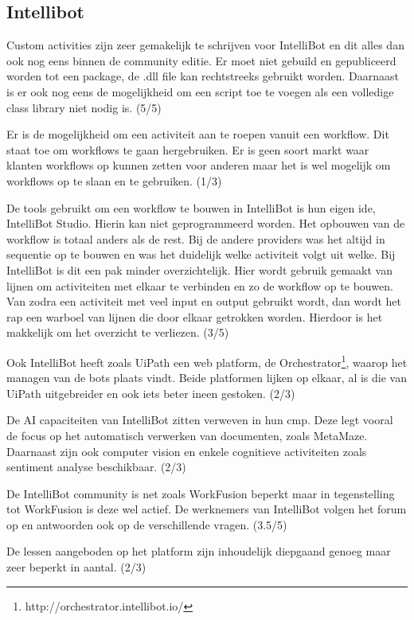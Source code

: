 \subsection{Intellibot}

Custom activities zijn zeer gemakelijk te schrijven voor IntelliBot en dit alles dan ook nog eens binnen de community editie. Er moet niet gebuild en gepubliceerd worden tot een package, de .dll file kan rechtstreeks gebruikt worden. Daarnaast is er ook nog eens de mogelijkheid om een script toe te voegen als een volledige class library niet nodig is. (5/5)

Er is de mogelijkheid om een activiteit aan te roepen vanuit een workflow. Dit staat toe om workflows te gaan hergebruiken. Er is geen soort markt waar klanten workflows op kunnen zetten voor anderen maar het is wel mogelijk om workflows op te slaan en te gebruiken. (1/3)

De tools gebruikt om een workflow te bouwen in IntelliBot is hun eigen ide, IntelliBot Studio. Hierin kan niet geprogrammeerd worden. Het opbouwen van de workflow is totaal anders als de rest. Bij de andere providers was het altijd in sequentie op te bouwen en was het duidelijk welke activiteit volgt uit welke. Bij IntelliBot is dit een pak minder overzichtelijk. Hier wordt gebruik gemaakt van lijnen om activiteiten met elkaar te verbinden en zo de workflow op te bouwen. Van zodra een activiteit met veel input en output gebruikt wordt, dan wordt het rap een warboel van lijnen die door elkaar getrokken worden. Hierdoor is het makkelijk om het overzicht te verliezen. (3/5)

Ook IntelliBot heeft zoals UiPath een web platform, de Orchestrator\footnote{http://orchestrator.intellibot.io/}, waarop het managen van de bots plaats vindt. Beide platformen lijken op elkaar, al is die van UiPath uitgebreider en ook iets beter ineen gestoken. (2/3)

De AI capaciteiten van IntelliBot zitten verweven in hun \acrfull{cmp}. Deze legt vooral de focus op het automatisch verwerken van documenten, zoals MetaMaze. Daarnaast zijn ook computer vision en enkele cognitieve activiteiten zoals sentiment analyse beschikbaar. (2/3)

De IntelliBot community is net zoals WorkFusion beperkt maar in tegenstelling tot WorkFusion is deze wel actief. De werknemers van IntelliBot volgen het forum op en antwoorden ook op de verschillende vragen. (3.5/5)

De lessen aangeboden op het platform zijn inhoudelijk diepgaand genoeg maar zeer beperkt in aantal. (2/3)

